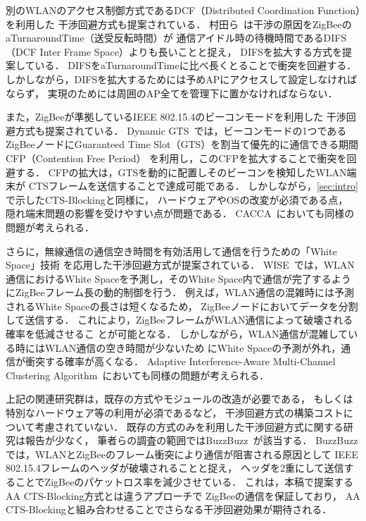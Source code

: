 \documentclass[technicalreport]{ieicej}
\begin{document}
別のWLANのアクセス制御方式であるDCF（Distributed Coordination Function）を利用した
干渉回避方式も提案されている．
村田ら~\cite{Murata14:}は干渉の原因をZigBeeのaTurnaroundTime（送受反転時間）が
通信アイドル時の待機時間であるDIFS（DCF Inter Frame Space）よりも長いことと捉え，
DIFSを拡大する方式を提案している．
DIFSをaTurnaroundTimeに比べ長くとることで衝突を回避する．
しかしながら，DIFSを拡大するためには予めAPにアクセスして設定しなければならず，
実現のためには周囲のAP全てを管理下に置かなければならない．

また，ZigBeeが準拠しているIEEE 802.15.4のビーコンモードを利用した
干渉回避方式も提案されている．
Dynamic GTS~\cite{Huang09:}では，ビーコンモードの1つである
ZigBeeノードにGuaranteed Time Slot（GTS）を割当て優先的に通信できる期間CFP（Contention Free Period）
を利用し，このCFPを拡大することで衝突を回避する．
CFPの拡大は，GTSを動的に配置しそのビーコンを検知したWLAN端末が
CTSフレームを送信することで達成可能である．
しかしながら，\ref{sec:intro}で示したCTS-Blockingと同様に，
ハードウェアやOSの改変が必須である点，
隠れ端末問題の影響を受けやすい点が問題である．
CACCA~\cite{Tytgat12:}においても同様の問題が考えられる．

さらに，無線通信の通信空き時間を有効活用して通信を行うための「White Space」技術
を応用した干渉回避方式が提案されている．
WISE~\cite{Huang10:}では，WLAN通信におけるWhite Spaceを予測し，そのWhite
Space内で通信が完了するようにZigBeeフレーム長の動的制御を行う．
例えば，WLAN通信の混雑時には予測されるWhite Spaceの長さは短くなるため，
ZigBeeノードにおいてデータを分割して送信する．
これにより，ZigBeeフレームがWLAN通信によって破壊される確率を低減させるこ
とが可能となる．
しかしながら，WLAN通信が混雑している時にはWLAN通信の空き時間が少ないため
にWhite Spaceの予測が外れ，通信が衝突する確率が高くなる．
Adaptive Interference-Aware Multi-Channel
Clustering Algorithm~\cite{Kang07:}においても同様の問題が考えられる．

上記の関連研究群は，既存の方式やモジュールの改造が必要である，
もしくは特別なハードウェア等の利用が必須であるなど，
干渉回避方式の構築コストについて考慮されていない．
既存の方式のみを利用した干渉回避方式に関する研究は報告が少なく，
筆者らの調査の範囲ではBuzzBuzz~\cite{Chieh10:}が該当する．
BuzzBuzzでは，WLANとZigBeeのフレーム衝突により通信が阻害される原因として
IEEE 802.15.4フレームのヘッダが破壊されることと捉え，
ヘッダを2重にして送信することでZigBeeのパケットロス率を減少させている．
これは，本稿で提案するAA CTS-Blocking方式とは違うアプローチで
ZigBeeの通信を保証しており，
AA CTS-Blockingと組み合わせることでさらなる干渉回避効果が期待される．
\end{document}
